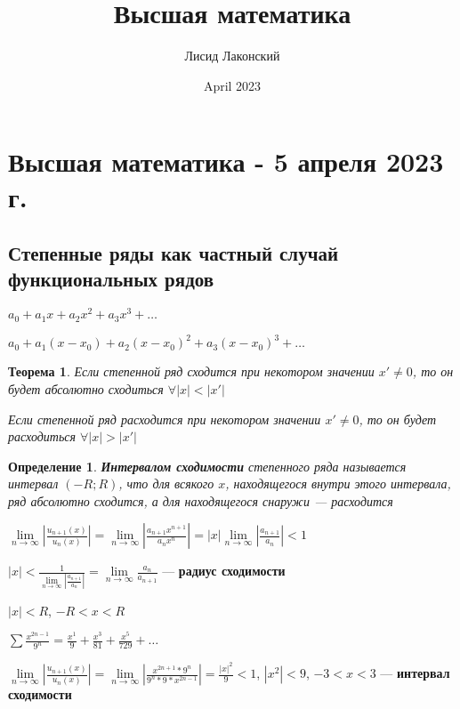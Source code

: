 \documentclass{article}
\title{Высшая математика}
\author{Лисид Лаконский}
\date{April 2023}
\newtheorem{definition}{Определение}
\newtheorem{theorem}{Теорема}
\begin{document}
\raggedright

\maketitle

\tableofcontents
\pagebreak

\section{Высшая математика - 5 апреля 2023 г.}

\subsection{Степенные ряды как частный случай функциональных рядов}

$a_0 + a_1 x + a_2 x^2 + a_3 x^3 + \dots$

$a_0 + a_1 (x - x_0) + a_2 (x - x_0)^2 + a_3 (x - x_0)^3 + \dots$

\begin{theorem}
Если степенной ряд сходится при некотором значении $x' \ne 0$, то он будет абсолютно сходиться $\forall |x| < |x'|$

Если степенной ряд расходится при некотором значении $x' \ne 0$, то он будет расходиться $\forall |x| > |x'|$
\end{theorem}

\begin{definition}
\textbf{Интервалом сходимости} степенного ряда называется интервал $(-R; R)$, что для всякого $x$, находящегося внутри этого интервала, ряд абсолютно сходится, а для находящегося снаружи — расходится
\end{definition}

$\lim\limits_{n \to \infty} |\frac{u_{n + 1} (x)}{u_{n} (x)}| = \lim\limits_{n \to \infty} |\frac{a_{n + 1} x^{n + 1}}{a_{n} x^{n}}| = |x| \lim\limits_{n \to \infty} |\frac{a_{n + 1}}{a_{n}}| < 1$

$|x| < \frac{1}{\lim\limits_{n \to \infty} |\frac{a_{n + 1}}{a_{n}}|} = \lim\limits_{n \to \infty} \frac{a_{n}}{a_{n + 1}}$ — \textbf{радиус сходимости}

$|x| < R$, $-R < x < R$

\hfill

$\sum \frac{x^{2 n - 1}}{9^{n}} = \frac{x^1}{9} + \frac{x^3}{81} + \frac{x^5}{729} + \dots$

$\lim\limits_{n \to \infty} |\frac{u_{n + 1} (x)}{u_{n} (x)}| = \lim\limits_{n \to \infty} | \frac{x^{2 n + 1} * 9^{n}}{9^{n} * 9 * x^{2 n - 1}} | = \frac{|x|^2}{9} < 1$, $|x^2| < 9$, $-3 < x < 3$ — \textbf{интервал сходимости}
\end{document}

